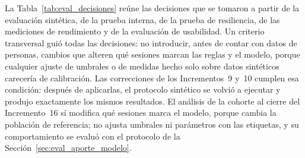 La Tabla~\ref{tab:eval_decisiones} reúne las decisiones que se tomaron a partir de la evaluación sintética, de la prueba interna, de la prueba de resiliencia, de las mediciones de rendimiento y de la evaluación de usabilidad. Un criterio transversal guió todas las decisiones: no introducir, antes de contar con datos de personas, cambios que alteren qué sesiones marcan las reglas y el modelo, porque cualquier ajuste de umbrales o de medidas hecho solo sobre datos sintéticos carecería de calibración. Las correcciones de los Incrementos~9 y~10 cumplen esa condición: después de aplicarlas, el protocolo sintético se volvió a ejecutar y produjo exactamente los mismos resultados. El análisis de la cohorte al cierre del Incremento~16 sí modifica qué sesiones marca el modelo, porque cambia la población de referencia; no ajusta umbrales ni parámetros con las etiquetas, y su comportamiento se evaluó con el protocolo de la Sección~\ref{sec:eval_aporte_modelo}.

